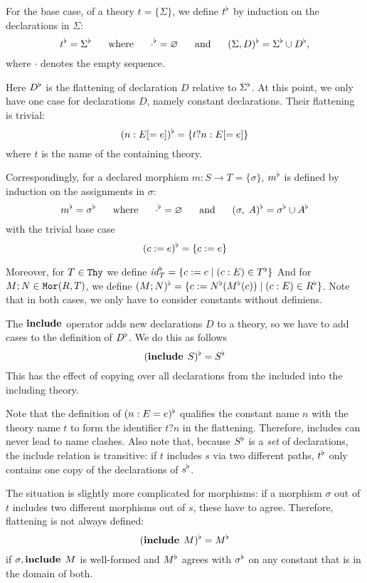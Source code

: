 \begin{definition}[Flattening]
For the base case, of a theory $t=\{\Sigma\}$, we define $\flt{t}$ by induction on the declarations in $\Sigma$:
\[\flt{t}=\flt{\Sigma} \tb\mwhere\tb \flt{\cdot}=\es \tb\mand\tb
 \flt{(\Sigma,D)}=\flt{\Sigma}\cup\fltd{\flt{\Sigma}}{D},\]
 where $\cdot$ denotes the empty sequence.
 
Here $\fltd{T}{D}$ is the flattening of declaration $D$ relative to $\flt{\Sigma}$.
At this point, we only have one case for declarations $D$, namely constant declarations.
Their flattening is trivial:
 \[\fltd{\Sigma}{(n:E[=e])}=\{t?n:E[=e]\}\]
where $t$ is the name of the containing theory.

Correspondingly, for a declared morphism $m:S\to T=\{\sigma\}$, $\flt{m}$ is defined by induction on the assignments in $\sigma$:
\[\flt{m}=\flt{\sigma} \tb\mwhere\tb \flt{\cdot}=\es \tb\mand\tb\flt{(\sigma,\;A)}=\flt{\sigma}\cup\fltd{\flt{\sigma}}{A}\]
with the trivial base case
 \[\fltd{\sigma}{(c:=e)}=\{c:=e\}\]
\begin{nomodexp}
Moreover, for $T\in\Thy$ we define $\flt{\id{T}}=\{c:=c \;|\; (c:E)\in\flt{T}\}$
And for $M;N\in\Mo{R}{T}$, we define $\flt{(M;N)}=\{c:=\flt{N}(\flt{M}(c)) \;|\; (c:E)\in\flt{R}\}$.
Note that in both cases, we only have to consider constants without definiens.
\end{nomodexp}
\end{definition}

\begin{example}\label{sem:incl}
The $\keyword{include}$ operator adds new declarations $D$ to a theory, so we have to add cases to the definition of $\fltd{\Sigma}{D}$.
We do this as follows
  \[\fltd{\Sigma}{(\icl{S})} = \flt{S}\]
This has the effect of copying over all declarations from the included into the including theory.

Note that the definition of $\fltd{\Sigma}{(n:E=e)}$ qualifies the constant name $n$ with the theory name $t$ to form the identifier $t?n$ in the flattening.
Therefore, includes can never lead to name clashes.
Also note that, because $\flt{S}$ is a \textit{set} of declarations, the include relation is transitive: if $t$ includes $s$ via two different paths, $\flt{t}$ only contains one copy of the declarations of $\flt{s}$.

The situation is slightly more complicated for morphisms: if a morphism $\sigma$ out of $t$ includes two different morphisms out of $s$, these have to agree.
Therefore, flattening is not always defined:
  \[\fltd{\sigma}{(\icl{M})} = \flt{M}\]
if $\sigma,\icl{M}$ is well-formed and $\flt{M}$ agrees with $\flt{\sigma}$ on any constant that is in the domain of both.
\end{example}

